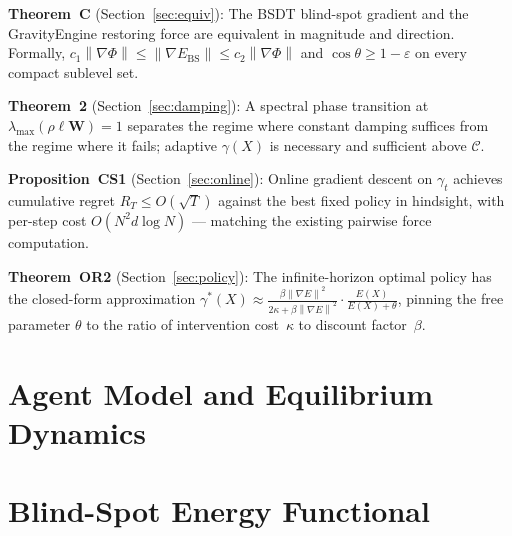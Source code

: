 \documentclass[11pt]{article}
\theoremstyle{definition}
\newcommand{\grad}{\nabla}
\newcommand{\Ebs}{E_{\mathrm{BS}}}
\newcommand{\Cman}{\mathcal{C}}
\newcommand{\lmax}{\lambda_{\max}}
\newcommand{\norm}[1]{\left\|#1\right\|}
\newcommand{\costheta}{\cos\theta}
\begin{document}
\begin{tcolorbox}[title=\textbf{Mathematical Overview}, colframe=blue!40!black,
                  colback=blue!5!white, breakable]
\textbf{Theorem~C} (Section~\ref{sec:equiv}): The BSDT blind-spot gradient and the
GravityEngine restoring force are equivalent in magnitude and direction.
Formally, $c_1\norm{\grad\Phi}\le\norm{\grad\Ebs}\le c_2\norm{\grad\Phi}$ and
$\costheta \ge 1 - \varepsilon$ on every compact sublevel set.

\smallskip
\textbf{Theorem~2} (Section~\ref{sec:damping}): A spectral phase transition at
$\lmax(\rho\ell\mathbf{W}) = 1$ separates the regime where constant damping
suffices from the regime where it fails; adaptive $\gamma(X)$ is necessary and
sufficient above $\Cman$.

\smallskip
\textbf{Proposition~CS1} (Section~\ref{sec:online}): Online gradient descent on
$\gamma_t$ achieves cumulative regret $R_T \le O(\sqrt{T})$ against the best fixed
policy in hindsight, with per-step cost $O(N^2 d \log N)$ — matching the existing
pairwise force computation.

\smallskip
\textbf{Theorem~OR2} (Section~\ref{sec:policy}): The infinite-horizon optimal
policy has the closed-form approximation
$\gamma^*(X) \approx \tfrac{\beta\norm{\grad E}^2}{2\kappa+\beta\norm{\grad E}^2}
\cdot \tfrac{E(X)}{E(X)+\theta}$,
pinning the free parameter $\theta$ to the ratio of intervention cost~$\kappa$
to discount factor~$\beta$.
\end{tcolorbox}


\section{Agent Model and Equilibrium Dynamics}
\label{sec:model}


\section{Blind-Spot Energy Functional}
\label{sec:bsdt}
\end{document}
